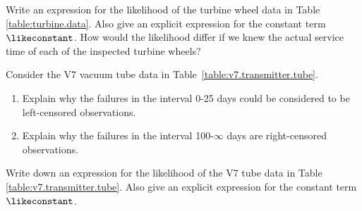 \begin{exercise}
Write an expression for the likelihood of the turbine wheel data in
Table \ref{table:turbine.data}.  Also give an explicit expression for
the constant term $\likeconstant$.  How would the likelihood differ if
we knew the actual service time of each of the inspected turbine
wheels?
\end{exercise}

\begin{exercise}
Consider the V7 vacuum tube data in Table~\ref{table:v7.transmitter.tube}.
\begin{enumerate}
\item
Explain why the failures in the interval 0-25 days could be considered
to be left-censored observations.
\item
Explain why the failures in the interval 100-$\infty$ days are
right-censored observations.
\end{enumerate}
\end{exercise}

\begin{exercise}
Write down an expression for the likelihood of the V7 tube data in
Table \ref{table:v7.transmitter.tube}. Also give an explicit
expression for the constant term $\likeconstant$.
\end{exercise}

